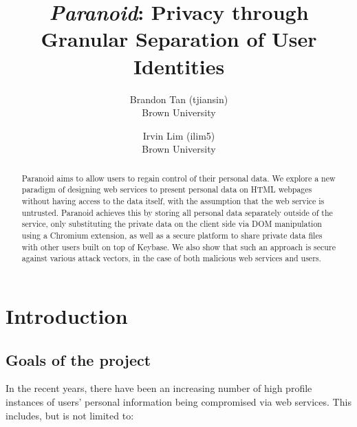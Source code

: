 \documentclass[letterpaper,twocolumn,10pt]{article}
\begin{document}

\date{}

\title{\Large{\bf \textit{Paranoid}: Privacy through Granular Separation of User Identities}}

\author{
    {\rm Brandon Tan (tjiansin)}\\
    Brown University
    \and
    {\rm Irvin Lim (ilim5)}\\
    Brown University
}

\maketitle

\begin{abstract}
    Paranoid aims to allow users to regain control of their personal data. We explore a new paradigm of
    designing web services to present personal data on HTML webpages without having access to the data
    itself, with the assumption that the web service is untrusted. Paranoid achieves this by storing all
    personal data separately outside of the service, only substituting the private data on the client
    side via DOM manipulation using a Chromium extension, as well as a secure platform to share private
    data files with other users built on top of Keybase. We also show that such an approach is secure
    against various attack vectors, in the case of both malicious web services and users.
\end{abstract}

\section{Introduction}

\subsection{Goals of the project}\label{sec:project_goals}

In the recent years, there have been an increasing number of high profile instances of users'
personal information being compromised via web services. This includes, but is not limited to:
\end{document}
